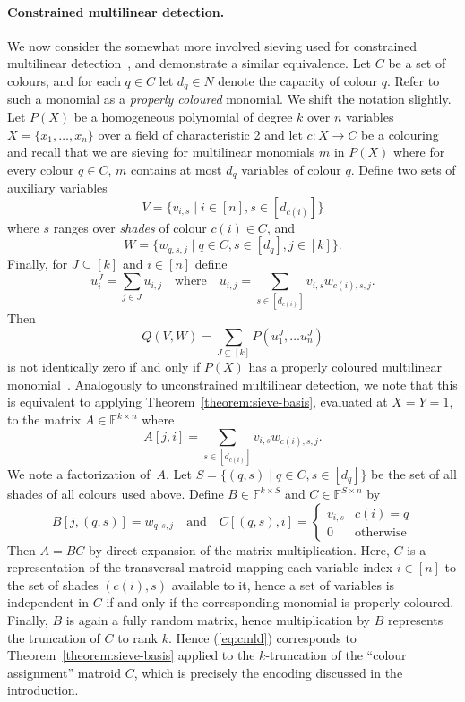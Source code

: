 \documentclass{theoretics}
\newcommand{\F}{\ensuremath{\mathbb F}\xspace}
\begin{document}
\paragraph{Constrained multilinear detection.}
We now consider the somewhat more involved sieving used for
constrained multilinear detection~\cite{BjorklundKK16},
and demonstrate a similar equivalence.
Let $C$ be a set of colours,  and for each $q \in C$
let $d_q \in N$ denote the capacity of colour $q$.
Refer to such a monomial as a \emph{properly coloured} monomial.
We shift the notation slightly. 
Let $P(X)$ be a homogeneous polynomial of degree $k$ over $n$
variables $X=\{x_1,\ldots,x_n\}$ over a field of characteristic 2 and let $c \colon X \to C$
be a colouring and recall that we are sieving for multilinear
monomials $m$ in $P(X)$ where for every colour $q \in C$,
$m$ contains at most $d_q$ variables of colour $q$.
Define two sets of auxiliary variables
\[
  V=\{v_{i,s} \mid i \in [n], s \in [d_{c(i)}]\}
\]
where $s$ ranges over \emph{shades} of colour $c(i) \in C$,
and
\[
  W=\{w_{q,s,j} \mid q \in C, s \in [d_q], j \in [k]\}.
\]
Finally, for $J \subseteq [k]$ and $i \in [n]$ define
\[
  u_i^J = \sum_{j \in J} u_{i,j} \quad \text{where} \quad
  u_{i,j} = \sum_{s \in [d_{c(i)}]} v_{i,s} w_{c(i),s,j}.
\]
Then
\begin{equation}
  Q(V,W) = \sum_{J \subseteq [k]} P(u_1^J, \ldots u_n^J)
  \label{eq:cmld}
\end{equation}
is not identically zero if and only if $P(X)$ has a properly coloured 
multilinear monomial~\cite{BjorklundKK16}. 
Analogously to unconstrained multilinear detection,
we note that this is equivalent to applying Theorem~\ref{theorem:sieve-basis},
evaluated at $X=Y=1$, to the matrix $A \in \F^{k \times n}$
where
\[
  A[j,i] = \sum_{s \in [d_{c(i)}]} v_{i,s} w_{c(i),s,j}.
\]
We note a factorization of~$A$. Let $S=\{(q,s) \mid q \in C, s \in [d_q]\}$
be the set of all shades of all colours used above. 
Define $B \in \F^{k \times S}$ and $C \in \F^{S \times n}$
by
\[
  B[j,(q,s)] = w_{q,s,j} \quad \text{and} \quad
  C[(q,s),i] = 
  \begin{cases}
    v_{i,s} & c(i)=q \\
    0 & \text{otherwise}
  \end{cases}
\]
Then $A=BC$ by direct expansion of the matrix multiplication.
Here, $C$ is a representation of the transversal matroid
mapping each variable index $i \in [n]$
to the set of shades $(c(i),s)$ available to it,
hence a set of variables is independent in $C$
if and only if the corresponding monomial is properly coloured.
Finally, $B$ is again a fully random matrix, hence
multiplication by $B$ represents the truncation of $C$ to rank $k$.
Hence (\ref{eq:cmld}) corresponds to Theorem~\ref{theorem:sieve-basis}
applied to the $k$-truncation of the ``colour assignment'' matroid $C$,
which is precisely the encoding discussed in the introduction.
\end{document}
